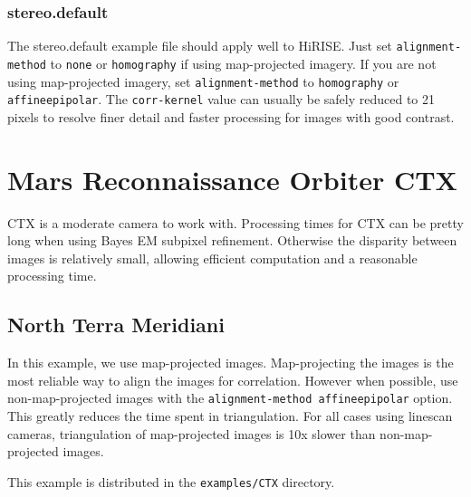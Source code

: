 \subsubsection*{stereo.default}

The stereo.default example file should apply well to HiRISE. Just set
\texttt{alignment-method} to \texttt{none} or \texttt{homography} if
using map-projected imagery. If you are not using map-projected
imagery, set \texttt{alignment-method} to \texttt{homography} or
\texttt{affineepipolar}. The \texttt{corr-kernel} value can usually be
safely reduced to 21 pixels to resolve finer detail and faster
processing for images with good contrast.

\vfill

\section{Mars Reconnaissance Orbiter CTX}

\ac{CTX} is a moderate camera to work with. Processing times for
\ac{CTX} can be pretty long when using Bayes EM subpixel
refinement. Otherwise the disparity between images is relatively
small, allowing efficient computation and a reasonable processing time.

\subsection{North Terra Meridiani}


In this example, we use map-projected images. Map-projecting the
images is the most reliable way to align the images for
correlation. However when possible, use non-map-projected images with
the \texttt{alignment-method affineepipolar} option. This greatly reduces
the time spent in triangulation. For all cases using linescan cameras,
triangulation of map-projected images is 10x slower than
non-map-projected images.

This example is distributed in the \texttt{examples/CTX} directory.

